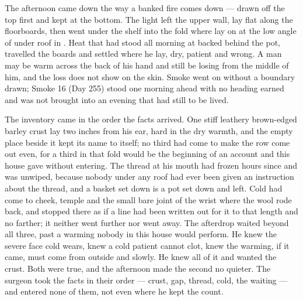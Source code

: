 The afternoon came down the way a banked fire comes down --- drawn off the top first and kept at the bottom. The light left the upper wall, lay flat along the floorboards, then went under the shelf into the fold where  lay on  at the low angle of  under  roof in . Heat that had stood all morning at  backed behind the pot, travelled the boards and settled where he lay, dry, patient and wrong. A man may be warm across the back of his hand and still be losing from the middle of him, and the loss does not show on the skin. Smoke went on without a boundary drawn; Smoke 16 (Day 255) stood one morning ahead with no heading earned and was not brought into an evening that had still to be lived.

The inventory came in the order the facts arrived. One stiff leathery brown-edged barley crust lay two inches from his ear, hard in the dry warmth, and the empty place beside it kept its name to itself; no third had come to make the row come out even, for a third in that fold would be the beginning of an account and this house gave without entering. The thread at his mouth had frozen hours since and was unwiped, because nobody under any roof had ever been given an instruction about the thread, and a basket set down is a pot set down and left. Cold had come to cheek, temple and the small bare joint of the wrist where the wool rode back, and stopped there as if a line had been written out for it to that length and no farther; it neither went further nor went away. The afterdrop waited beyond all three, past a warming nobody in this house would perform. He knew the severe face cold wears, knew a cold patient cannot clot, knew the warming, if it came, must come from outside and slowly. He knew all of it and wanted the crust. Both were true, and the afternoon made the second no quieter. The surgeon took the facts in their order --- crust, gap, thread, cold, the waiting --- and entered none of them, not even where he kept the count.

